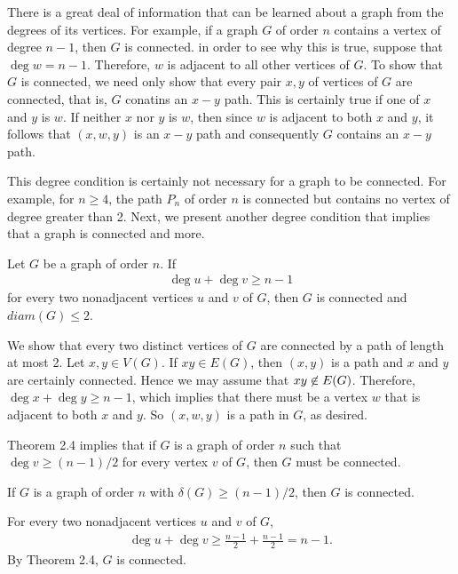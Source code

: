 There is a great deal of information that can be learned about a graph from the degrees of its vertices. For example, if a graph $G$ of order $n$ contains a vertex of degree $n-1$, then $G$ is connected. in order to see why this is true, suppose that $\deg{}{w} = n-1$. Therefore, $w$ is adjacent to all other vertices of $G$. To show that $G$ is connected, we need only show that every pair $x,y$ of vertices of $G$ are connected, that is, $G$ conatins an $x-y$ path. This is certainly true if one of $x$ and $y$ is $w$. If neither $x$ nor $y$ is $w$, then since $w$ is adjacent to both $x$ and $y$, it follows that $(x,w,y)$ is an $x-y$ path and consequently $G$ contains an $x-y$ path.

This degree condition is certainly not necessary for a graph to be connected. For example, for $n \geq 4$, the path $P_{n}$ of order $n$ is connected but contains no vertex of degree greater than 2. Next, we present another degree condition that implies that a graph is connected and more.

\begin{thm}
Let $G$ be a graph of order $n$. If
\begin{align*}
\deg{}{u}+\deg{}{v} \geq n-1
\end{align*}
for every two nonadjacent vertices $u$ and $v$ of $G$, then $G$ is connected and $diam(G) \leq 2$.
\end{thm}

\begin{pf}
We show that every two distinct vertices of $G$ are connected by a path of length at most 2. Let $x,y \in V(G)$. If $xy \in E(G)$, then $(x,y)$ is a path and $x$ and $y$ are certainly connected. Hence we may assume that $xy \centernot\in E(G)$. Therefore, $\deg{}{x}+\deg{}{y} \geq n-1$, which implies that there must be a vertex $w$ that is adjacent to both $x$ and $y$. So $(x,w,y)$ is a path in $G$, as desired.
\end{pf}

Theorem 2.4 implies that if $G$ is a graph of order $n$ such that $\deg{}{v} \geq (n-1)/2$ for every vertex $v$ of $G$, then $G$ must be connected.

\begin{cor}
If $G$ is a graph of order $n$ with $\delta(G) \geq (n-1)/2$, then $G$ is connected.
\end{cor}

\begin{pf}
For every two nonadjacent vertices $u$ and $v$ of $G$,
\begin{align*}
\deg{}{u}+\deg{}{v} \geq \frac{n-1}{2} + \frac{n-1}{2} = n-1.
\end{align*}
By Theorem 2.4, $G$ is connected.
\end{pf}

